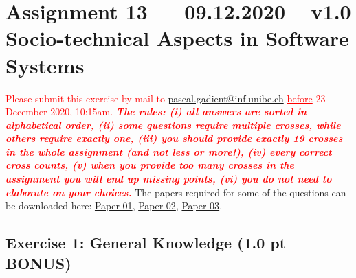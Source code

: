 \documentclass [11pt, a4wide, twoside]{article}
\newcommand{\cmark}{\ding{51}}%
\newcommand{\xmark}{\ding{55}}%
\newcommand{\done}{\rlap{$\square$}{\raisebox{2pt}{\large\hspace{1pt}\cmark}}%
\hspace{-2.5pt}}
\newcommand{\wontfix}{\rlap{$\square$}{\large\hspace{1pt}\xmark}}
\begin{document}
\section*{Assignment 13 --- 09.12.2020 -- v1.0\\Socio-technical Aspects in Software Systems}

\textcolor{red}{Please submit this exercise by mail to \href{mailto:pascal.gadient@inf.unibe.ch}{pascal.gadient@inf.unibe.ch} \underline{before} 23 December 2020, 10:15am.}
\newline\newline \textbf{\textcolor{red}{\textit{The rules: (i) all answers are sorted in alphabetical order, (ii) some questions require multiple crosses, while others require exactly one, (iii) you should provide exactly 19 crosses in the whole assignment (and not less or more!), (iv) every correct cross counts, (v) when you provide too many crosses in the assignment you will end up missing points, (vi) you do not need to elaborate on your choices.}}}
\newline\newline The papers required for some of the questions can be downloaded here: \href{https://www.cs.drexel.edu/\~yfcai/CS680/Readings/Week8/Identification\%20of\%20Coordination\%20Requirements.pdf}{Paper 01}, \href{https://www.microsoft.com/en-us/research/wp-content/uploads/2016/02/bird2011dtm.pdf}{Paper 02}, \href{https://www.researchgate.net/publication/221560626\_Latent\_social\_structure\_in\_open\_source\_projects}{Paper 03}.


\subsection*{Exercise 1: General Knowledge (1.0 pt BONUS)}
\end{document}
